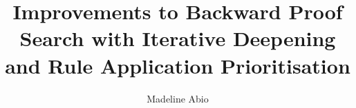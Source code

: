 \documentclass[runningheads]{llncs}
\begin{document}
\title{Improvements to Backward Proof Search with Iterative
Deepening and Rule Application Prioritisation}

\author{Madeline Abio}

\maketitle
\begin{abstract}
  
\end{abstract}








\FloatBarrier




\end{document}
